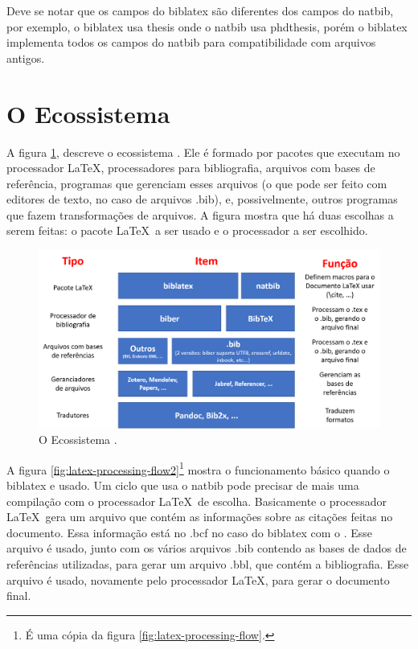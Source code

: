 Deve se notar que os campos do biblatex são diferentes dos campos do natbib, por exemplo, o biblatex usa thesis onde o natbib usa phdthesis, porém o biblatex implementa todos os campos do natbib para compatibilidade com
arquivos antigos.



\section{O Ecossistema }


A figura \ref{fig:mundolatexport}\autocite{bibera2012}, descreve o ecossistema . Ele é formado por pacotes que executam no processador \LaTeX , processadores para bibliografia, arquivos com bases de referência, programas que gerenciam esses arquivos (o que pode ser feito com editores de texto, no caso de arquivos .bib), e, possivelmente, outros programas que fazem transformações de arquivos. A figura mostra que há duas escolhas a serem feitas: o pacote \LaTeX\  a ser usado e o processador
a ser escolhido. 

\begin{figure}[hbt]
    \centering
    \includegraphics[width=0.9\linewidth]{Images/mundolatexport}
    \caption{O Ecossistema \parencite{bibera2012}.}
    \label{fig:mundolatexport}
\end{figure}



A figura \ref{fig:latex-processing-flow2}\footnote{É uma cópia da figura \ref{fig:latex-processing-flow}.} mostra o funcionamento básico quando o biblatex e usado. Um ciclo que usa o natbib pode precisar de mais uma compilação com o processador \LaTeX\  de escolha. Basicamente o processador \LaTeX\   gera um arquivo que contém as informações sobre as citações feitas no documento. Essa informação está no .bcf no caso do biblatex com o . Esse arquivo é usado, junto com os vários arquivos .bib contendo as bases de dados de referências utilizadas, para gerar um arquivo .bbl, que contém a bibliografia. Esse arquivo é usado, novamente pelo processador \LaTeX, para gerar o documento final. 


